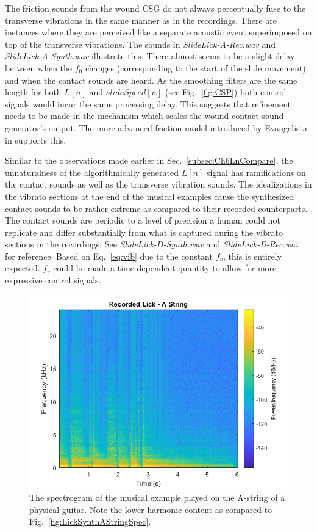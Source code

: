 \documentclass[../main.tex]{subfiles}
\begin{document}
The friction sounds from the wound CSG do not always perceptually fuse to the transverse vibrations in the same manner as in the recordings. There are instances where they are perceived like a separate acoustic event superimposed on top of the transverse vibrations. The sounds in \emph{SlideLick-A-Rec.wav} and \emph{SlideLick-A-Synth.wav} illustrate this. There almost seems to be a slight delay between when the $f_0$ changes (corresponding to the start of the  slide movement) and when the contact sounds are heard. As the smoothing filters are the same length for both $L[n]$ and $slideSpeed[n]$ (see Fig.~\ref{fig:CSP}) both control signals would incur the same processing delay. This suggests that refinement needs to be made in the mechanism which scales the wound contact sound generator's output. The more advanced friction model introduced by Evangelista in  supports this.

Similar to the observations made earlier in Sec.~\ref{subsec:Ch6LnCompare}, the unnaturalness of the algorithmically generated $L[n]$ signal has ramifications on the contact sounds as well as the transverse vibration sounds. The idealizations in the vibrato sections at the end of the musical examples cause the synthesized contact sounds to be rather extreme as compared to their recorded counterparts. The contact sounds are periodic to a level of precision a human could not replicate and differ substantially from what is captured during the vibrato sections in the recordings. See \emph{SlideLick-D-Synth.wav} and \emph{SlideLick-D-Rec.wav} for reference. Based on Eq.~\ref{eq:vib} due to the constant $f_v$, this is entirely expected. $f_v$ could be made a time-dependent quantity to allow for more expressive control signals.

\begin{figure}[h]
    \centering
    \includegraphics[scale=.65]{./images/plots/LickRecAString.png}
    \caption{The spectrogram of the musical example played on the A-string of a physical guitar. Note the lower harmonic content as compared to Fig.~\ref{fig:LickSynthAStringSpec}.}
    \label{fig:LickRecAStringSpec}
\end{figure}
\end{document}
